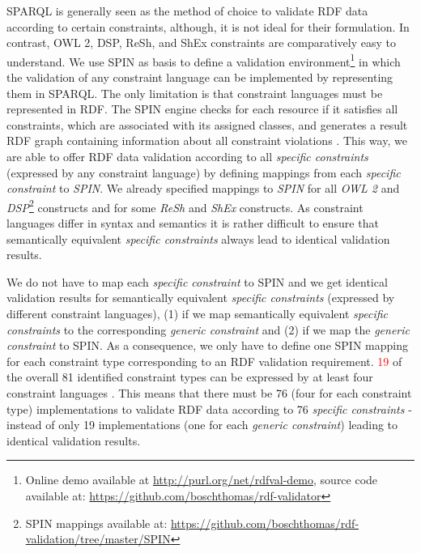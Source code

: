 \documentclass[a4paper,fontsize=11pt]{scrartcl}
\begin{document}
SPARQL is generally seen as the method of choice to validate RDF data according to certain constraints, although, it is not ideal for their formulation. 
In contrast, OWL 2, DSP, ReSh, and ShEx constraints are comparatively easy to understand. 
We use SPIN as basis to define a
validation environment\footnote{Online demo available at \url{http://purl.org/net/rdfval-demo}, source code available at: \url{https://github.com/boschthomas/rdf-validator}\label{rdf-validator}} in which the validation of any constraint language can be implemented by representing them in SPARQL.
The only limitation is that constraint languages must be represented in RDF.
The SPIN engine checks for each resource if it satisfies all constraints, which are associated with its assigned classes, and generates a result RDF graph containing information about all constraint violations \cite{BoschEckert2014-2}.
This way, we are able to offer RDF data validation according to all \emph{specific constraints} (expressed by any constraint language) by defining mappings from each \emph{specific constraint} to \emph{SPIN}. 
We already specified mappings to \emph{SPIN} for all \emph{OWL 2} and \emph{DSP}\footnote{SPIN mappings available at: \url{https://github.com/boschthomas/rdf-validation/tree/master/SPIN}} constructs and for some \emph{ReSh} and \emph{ShEx} constructs.
As constraint languages differ in syntax and semantics it is rather difficult to ensure that semantically equivalent \emph{specific constraints} always lead to identical validation results.

We do not have to map each \emph{specific constraint} to SPIN and we get identical validation results for semantically equivalent \emph{specific constraints} (expressed by different constraint languages),
(1) if we map semantically equivalent \emph{specific constraints} to the corresponding \emph{generic constraint} and 
(2) if we map the \emph{generic constraint} to SPIN.
As a consequence, we only have to define one SPIN mapping for each constraint type corresponding to an RDF validation requirement.
\textcolor{red}{19} of the overall 81 identified constraint types can be expressed by at least four constraint languages \cite{BoschNolleAcarEckert2015}.
This means that there must be 76 (four for each constraint type) implementations to validate RDF data according to 76 \emph{specific constraints} - instead of only 19 implementations (one for each \emph{generic constraint}) leading to identical validation results.
\end{document}
